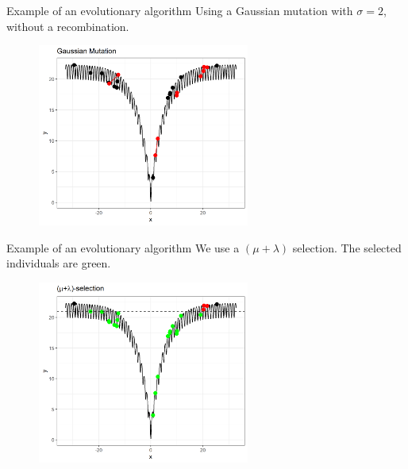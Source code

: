 \documentclass[11pt,compress,t,notes=noshow, xcolor=table]{beamer}
\begin{document}
\begin{vbframe}{Example of an evolutionary algorithm}
Using a Gaussian mutation with $\sigma=2$, without a recombination.
\vspace{0.5cm}

\begin{center}
\begin{figure}
  \includegraphics[height = 6cm, width = 7cm]{figure_man/gaussian-mutation.png}
\end{figure}
\end{center}

\end{vbframe}


\begin{vbframe}{Example of an evolutionary algorithm}
We use a $(\mu + \lambda)$ selection. The selected individuals are green.

\vspace{0.5cm}

\begin{center}
\begin{figure}
  \includegraphics[height = 6cm, width = 7cm]{figure_man/selection.png}
\end{figure}
\end{center}


\end{vbframe}



\endlecture
\end{document}
